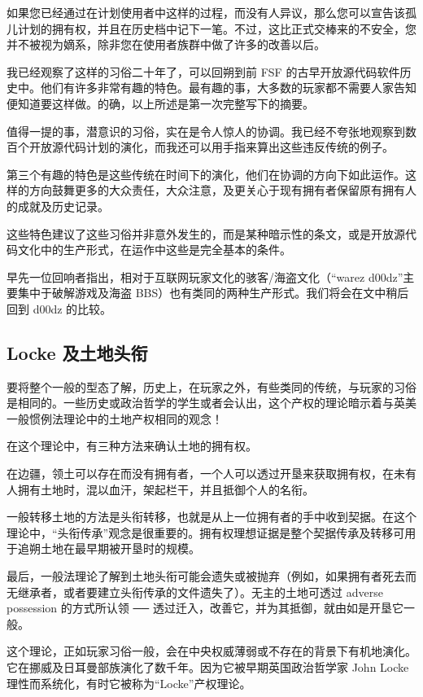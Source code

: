 如果您已经通过在计划使用者中这样的过程，而没有人异议，那么您可以宣告该孤儿计划的拥有权，并且在历史档中记下一笔。不过，这比正式交棒来的不安全，您并不被视为嫡系，除非您在使用者族群中做了许多的改善以后。

我已经观察了这样的习俗二十年了，可以回朔到前 FSF 的古早开放源代码软件历史中。他们有许多非常有趣的特色。最有趣的事，大多数的玩家都不需要人家告知便知道要这样做。的确，以上所述是第一次完整写下的摘要。

值得一提的事，潜意识的习俗，实在是令人惊人的协调。我已经不夸张地观察到数百个开放源代码计划的演化，而我还可以用手指来算出这些违反传统的例子。

第三个有趣的特色是这些传统在时间下的演化，他们在协调的方向下如此运作。这样的方向鼓舞更多的大众责任，大众注意，及更关心于现有拥有者保留原有拥有人的成就及历史记录。

这些特色建议了这些习俗并非意外发生的，而是某种暗示性的条文，或是开放源代码文化中的生产形式，在运作中这些是完全基本的条件。

早先一位回响者指出，相对于互联网玩家文化的骇客/海盗文化（“warez d00dz”主要集中于破解游戏及海盗 BBS）也有类同的两种生产形式。我们将会在文中稍后回到 d00dz 的比较。

\subsection{Locke 及土地头衔}
要将整个一般的型态了解，历史上，在玩家之外，有些类同的传统，与玩家的习俗是相同的。一些历史或政治哲学的学生或者会认出，这个产权的理论暗示着与英美一般惯例法理论中的土地产权相同的观念！

在这个理论中，有三种方法来确认土地的拥有权。

在边疆，领土可以存在而没有拥有者，一个人可以透过开垦来获取拥有权，在未有人拥有土地时，混以血汗，架起栏干，并且抵御个人的名衔。

一般转移土地的方法是头衔转移，也就是从上一位拥有者的手中收到契据。在这个理论中，“头衔传承”观念是很重要的。拥有权理想证据是整个契据传承及转移可用于追朔土地在最早期被开垦时的规模。

最后，一般法理论了解到土地头衔可能会遗失或被抛弃（例如，如果拥有者死去而无继承者，或者要建立头衔传承的文件遗失了）。无主的土地可透过 adverse possession 的方式所认领  ──  透过迁入，改善它，并为其抵御，就由如是开垦它一般。

这个理论，正如玩家习俗一般，会在中央权威薄弱或不存在的背景下有机地演化。它在挪威及日耳曼部族演化了数千年。因为它被早期英国政治哲学家 John Locke 理性而系统化，有时它被称为“Locke”产权理论。

